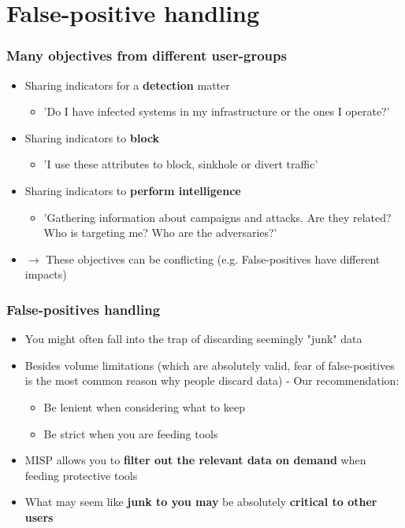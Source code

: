 \section{False-positive handling}

\begin{frame}
	\frametitle{Many objectives from different user-groups}
    \begin{itemize}
        \item Sharing indicators for a \textbf{detection} matter
        \begin{itemize}
            \item 'Do I have infected systems in my infrastructure or the ones I operate?'
        \end{itemize}
        \item Sharing indicators to \textbf{block}
        \begin{itemize}
            \item 'I use these attributes to block, sinkhole or divert traffic'
		\end{itemize}
		\item Sharing indicators to \textbf{perform intelligence}
		\begin{itemize}
			\item 'Gathering information about campaigns and attacks. Are they related? Who is targeting me? Who are the adversaries?'
		\end{itemize}
		\item $\rightarrow$ These objectives can be conflicting (e.g. False-positives have different impacts)
	\end{itemize}
\end{frame}

\begin{frame}
	\frametitle{False-positives handling}
	\begin{itemize}
		\item You might often fall into the trap of discarding seemingly "junk" data
		\item Besides volume limitations (which are absolutely valid, fear of false-positives is the most common reason why people discard data) - Our recommendation:
		\begin{itemize}
			\item Be lenient when considering what to keep
			\item Be strict when you are feeding tools
		\end{itemize}
	\item MISP allows you to \textbf{filter out the relevant data on demand} when feeding protective tools
	\item What may seem like \textbf{junk to you may} be absolutely \textbf{critical to other users}
	\end{itemize}
\end{frame}

